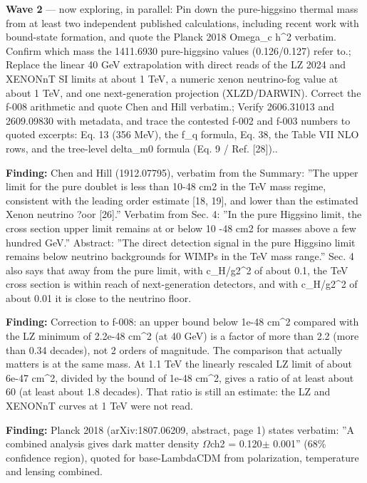 \documentclass[11pt,a4paper]{article}
\begin{document}
\textbf{Wave 2} --- now exploring, in parallel: Pin down the pure-higgsino thermal mass from at least two independent published calculations, including recent work with bound-state formation, and quote the Planck 2018 Omega\_c h\textasciicircum{}2 verbatim. Confirm which mass the 1411.6930 pure-higgsino values (0.126/0.127) refer to.; Replace the linear 40 GeV extrapolation with direct reads of the LZ 2024 and XENONnT SI limits at about 1 TeV, a numeric xenon neutrino-fog value at about 1 TeV, and one next-generation projection (XLZD/DARWIN). Correct the f-008 arithmetic and quote Chen and Hill verbatim.; Verify 2606.31013 and 2609.09830 with metadata, and trace the contested f-002 and f-003 numbers to quoted excerpts: Eq. 13 (356 MeV), the f\_q formula, Eq. 38, the Table VII NLO rows, and the tree-level delta\_m0 formula (Eq. 9 / Ref. [28])..

\textbf{Finding:} Chen and Hill (1912.07795), verbatim from the Summary: ''The upper limit for the pure doublet is less than 10-48 cm2 in the TeV mass regime, consistent with the leading order estimate [18, 19], and lower than the estimated Xenon neutrino ?oor [26].'' Verbatim from Sec. 4: ''In the pure Higgsino limit, the cross section upper limit remains at or below 10 -48 cm2 for masses above a few hundred GeV.'' Abstract: ''The direct detection signal in the pure Higgsino limit remains below neutrino backgrounds for WIMPs in the TeV mass range.'' Sec. 4 also says that away from the pure limit, with c\_H/g2\textasciicircum{}2 of about 0.1, the TeV cross section is within reach of next-generation detectors, and with c\_H/g2\textasciicircum{}2 of about 0.01 it is close to the neutrino floor.

\textbf{Finding:} Correction to f-008: an upper bound below 1e-48 cm\textasciicircum{}2 compared with the LZ minimum of 2.2e-48 cm\textasciicircum{}2 (at 40 GeV) is a factor of more than 2.2 (more than 0.34 decades), not 2 orders of magnitude. The comparison that actually matters is at the same mass. At 1.1 TeV the linearly rescaled LZ limit of about 6e-47 cm\textasciicircum{}2, divided by the bound of 1e-48 cm\textasciicircum{}2, gives a ratio of at least about 60 (at least about 1.8 decades). That ratio is still an estimate: the LZ and XENONnT curves at 1 TeV were not read.

\textbf{Finding:} Planck 2018 (arXiv:1807.06209, abstract, page 1) states verbatim: ''A combined analysis gives dark matter density $\Omega$ch2 = 0.120$\pm$ 0.001'' (68\% confidence region), quoted for base-LambdaCDM from polarization, temperature and lensing combined.
\end{document}
